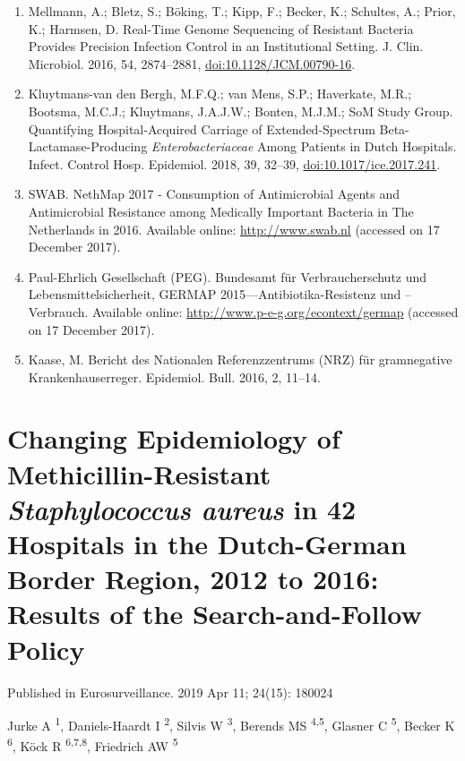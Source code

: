 \documentclass[
]{book}
\begin{document}
\begin{enumerate}
\item
  Mellmann, A.; Bletz, S.; Böking, T.; Kipp, F.; Becker, K.; Schultes, A.; Prior, K.; Harmsen, D. Real-Time Genome Sequencing of Resistant Bacteria Provides Precision Infection Control in an Institutional Setting. J. Clin. Microbiol. 2016, 54, 2874--2881, \url{doi:10.1128/JCM.00790-16}.
\item
  Kluytmans-van den Bergh, M.F.Q.; van Mens, S.P.; Haverkate, M.R.; Bootsma, M.C.J.; Kluytmans, J.A.J.W.; Bonten, M.J.M.; SoM Study Group. Quantifying Hospital-Acquired Carriage of Extended-Spectrum Beta-Lactamase-Producing \emph{Enterobacteriaceae} Among Patients in Dutch Hospitals. Infect. Control Hosp. Epidemiol. 2018, 39, 32--39, \url{doi:10.1017/ice.2017.241}.
\item
  SWAB. NethMap 2017 - Consumption of Antimicrobial Agents and Antimicrobial Resistance among Medically Important Bacteria in The Netherlands in 2016. Available online: \url{http://www.swab.nl} (accessed on 17 December 2017).
\item
  Paul-Ehrlich Gesellschaft (PEG). Bundesamt für Verbraucherschutz und Lebensmittelsicherheit, GERMAP 2015---Antibiotika-Resistenz und --Verbrauch. Available online: \url{http://www.p-e-g.org/econtext/germap} (accessed on 17 December 2017).
\item
  Kaase, M. Bericht des Nationalen Referenzzentrums (NRZ) für gramnegative Krankenhauserreger. Epidemiol. Bull. 2016, 2, 11--14.
\end{enumerate}

\hypertarget{ch09-changing-epidemiology}{%
\chapter{\texorpdfstring{Changing Epidemiology of Methicillin-Resistant \emph{Staphylococcus aureus} in 42 Hospitals in the Dutch-German Border Region, 2012 to 2016: Results of the Search-and-Follow Policy}{Changing Epidemiology of Methicillin-Resistant Staphylococcus aureus in 42 Hospitals in the Dutch-German Border Region, 2012 to 2016: Results of the Search-and-Follow Policy}}\label{ch09-changing-epidemiology}}

Published in Eurosurveillance. 2019 Apr 11; 24(15): 180024

Jurke A \textsuperscript{1}, Daniels-Haardt I \textsuperscript{2}, Silvis W \textsuperscript{3}, Berends MS \textsuperscript{4,5}, Glasner C \textsuperscript{5}, Becker K \textsuperscript{6}, Köck R \textsuperscript{6,7,8}, Friedrich AW \textsuperscript{5}
\end{document}
